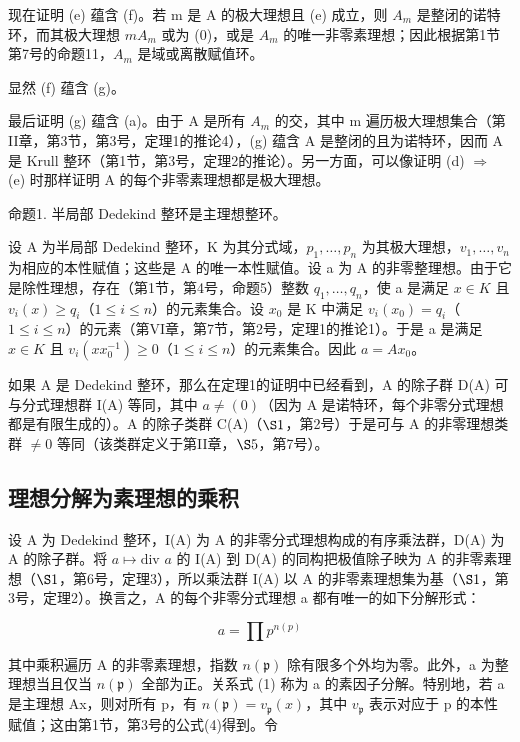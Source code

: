 现在证明 (e) 蕴含 (f)。若 m 是 A 的极大理想且 (e) 成立，则 \(A_{m}\) 是整闭的诺特环，而其极大理想 \(mA_{m}\) 或为 (0)，或是 \(A_{m}\) 的唯一非零素理想；因此根据第1节第7号的命题11，\(A_{m}\) 是域或离散赋值环。

显然 (f) 蕴含 (g)。

最后证明 (g) 蕴含 (a)。由于 A 是所有 \(A_{m}\) 的交，其中 m 遍历极大理想集合（第II章，第3节，第3号，定理1的推论4），(g) 蕴含 A 是整闭的且为诺特环，因而 A 是 Krull 整环（第1节，第3号，定理2的推论）。另一方面，可以像证明 (d) \(\Rightarrow\) (e) 时那样证明 A 的每个非零素理想都是极大理想。

命题1. 半局部 Dedekind 整环是主理想整环。

设 A 为半局部 Dedekind 整环，K 为其分式域，\(p_{1}, \ldots, p_{n}\) 为其极大理想，\(v_{1}, \ldots, v_{n}\) 为相应的本性赋值；这些是 A 的唯一本性赋值。设 a 为 A 的非零整理想。由于它是除性理想，存在（第1节，第4号，命题5）整数 \(q_{1}, \ldots, q_{n}\)，使 a 是满足 \(x \in K\) 且 \(v_{i}(x) \geqslant q_{i}\)（\(1 \leqslant i \leqslant n\)）的元素集合。设 \(x_{0}\) 是 K 中满足 \(v_{i}(x_{0}) = q_{i}\)（\(1 \leqslant i \leqslant n\)）的元素（第VI章，第7节，第2号，定理1的推论1）。于是 a 是满足 \(x \in K\) 且 \(v_{i}(xx_{0}^{-1}) \geqslant 0\)（\(1 \leqslant i \leqslant n\)）的元素集合。因此 \(a = Ax_{0}\)。

如果 A 是 Dedekind 整环，那么在定理1的证明中已经看到，A 的除子群 D(A) 可与分式理想群 I(A) 等同，其中 \(a \neq (0)\)（因为 A 是诺特环，每个非零分式理想都是有限生成的）。A 的除子类群 C(A)（\(\S 1\)，第2号）于是可与 A 的非零理想类群 \(\neq 0\) 等同（该类群定义于第II章，\(\S 5\)，第7号）。

\subsection{理想分解为素理想的乘积}

设 A 为 Dedekind 整环，I(A) 为 A 的非零分式理想构成的有序乘法群，D(A) 为 A 的除子群。将 \(a \mapsto \text{div } a\) 的 I(A) 到 D(A) 的同构把极值除子映为 A 的非零素理想（\(\S 1\)，第6号，定理3），所以乘法群 I(A) 以 A 的非零素理想集为基（\(\S 1\)，第3号，定理2）。换言之，A 的每个非零分式理想 a 都有唯一的如下分解形式：

\[
a = \prod p ^ {n (p)}\tag{1}
\]

其中乘积遍历 A 的非零素理想，指数 \(n(\mathfrak{p})\) 除有限多个外均为零。此外，a 为整理想当且仅当 \(n(\mathfrak{p})\) 全部为正。关系式 (1) 称为 a 的素因子分解。特别地，若 a 是主理想 Ax，则对所有 p，有 \(n(\mathfrak{p}) = v_{\mathfrak{p}}(x)\)，其中 \(v_{\mathfrak{p}}\) 表示对应于 p 的本性赋值；这由第1节，第3号的公式(4)得到。令


